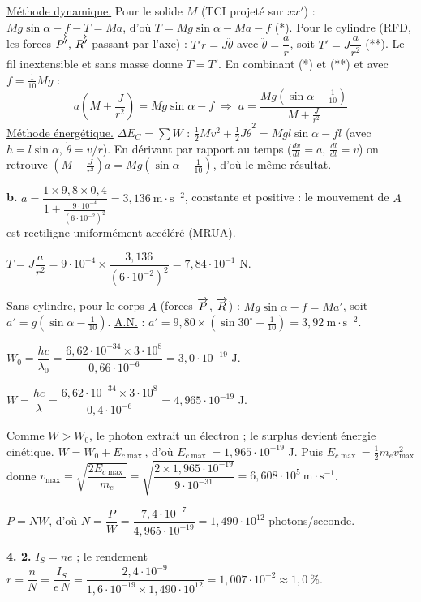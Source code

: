 \documentclass[11pt]{article}
\begin{document}
 \underline{Méthode dynamique.} Pour le solide $M$ (TCI projeté sur $xx'$) : $Mg\sin\alpha - f - T = Ma$, d'où $T = Mg\sin\alpha - Ma - f$ \;(*). Pour le cylindre (RFD, les forces $\overrightarrow{P'}$, $\overrightarrow{R'}$ passant par l'axe) : $T'r = J\ddot{\theta}$ avec $\ddot{\theta} = \dfrac{a}{r}$, soit $T' = J\dfrac{a}{r^2}$ \;(**). Le fil inextensible et sans masse donne $T = T'$. En combinant (*) et (**) et avec $f = \frac{1}{10}Mg$ :
\[ a\left(M + \frac{J}{r^2}\right) = Mg\sin\alpha - f \;\Rightarrow\; \boxed{a = \dfrac{Mg\left(\sin\alpha - \frac{1}{10}\right)}{M + \frac{J}{r^2}}} \]
\underline{Méthode énergétique.} $\Delta E_C = \sum W$ : $\frac{1}{2}Mv^2 + \frac{1}{2}J\dot{\theta}^2 = Mgl\sin\alpha - f l$ (avec $h = l\sin\alpha$, $\dot{\theta} = v/r$). En dérivant par rapport au temps ($\frac{dv}{dt} = a$, $\frac{dl}{dt} = v$) on retrouve $\left(M + \frac{J}{r^2}\right)a = Mg\left(\sin\alpha - \frac{1}{10}\right)$, d'où le même résultat.

\textbf{b.} $a = \dfrac{1\times 9{,}8\times 0{,}4}{1 + \frac{9\cdot10^{-4}}{(6\cdot10^{-2})^2}} = 3{,}136\ \text{m}\cdot\text{s}^{-2}$, constante et positive : le mouvement de $A$ est rectiligne uniformément accéléré (MRUA).

 $T = J\dfrac{a}{r^2} = 9\cdot10^{-4}\times\dfrac{3{,}136}{(6\cdot10^{-2})^2} = 7{,}84\cdot10^{-1}$ N.

 Sans cylindre, pour le corps $A$ (forces $\overrightarrow{P}$, $\overrightarrow{R}$) : $Mg\sin\alpha - f = Ma'$, soit $a' = g\left(\sin\alpha - \frac{1}{10}\right)$. \underline{A.N.} : $a' = 9{,}80\times\left(\sin 30^\circ - \frac{1}{10}\right) = 3{,}92\ \text{m}\cdot\text{s}^{-2}$.


 $W_0 = \dfrac{hc}{\lambda_0} = \dfrac{6{,}62\cdot10^{-34}\times 3\cdot10^{8}}{0{,}66\cdot10^{-6}} = 3{,}0\cdot10^{-19}$ J.

 $W = \dfrac{hc}{\lambda} = \dfrac{6{,}62\cdot10^{-34}\times 3\cdot10^{8}}{0{,}4\cdot10^{-6}} = 4{,}965\cdot10^{-19}$ J.

 Comme $W > W_0$, le photon extrait un électron ; le surplus devient énergie cinétique. $W = W_0 + E_{c\max}$, d'où $E_{c\max} = 1{,}965\cdot10^{-19}$ J. Puis $E_{c\max} = \frac{1}{2}m_e v_{\max}^2$ donne $v_{\max} = \sqrt{\dfrac{2E_{c\max}}{m_e}} = \sqrt{\dfrac{2\times 1{,}965\cdot10^{-19}}{9\cdot10^{-31}}} = 6{,}608\cdot10^{5}\ \text{m}\cdot\text{s}^{-1}$.

 $P = NW$, d'où $N = \dfrac{P}{W} = \dfrac{7{,}4\cdot10^{-7}}{4{,}965\cdot10^{-19}} = 1{,}490\cdot10^{12}$ photons/seconde.

\textbf{4. 2.} $I_S = ne$ ; le rendement $r = \dfrac{n}{N} = \dfrac{I_S}{e\,N} = \dfrac{2{,}4\cdot10^{-9}}{1{,}6\cdot10^{-19}\times 1{,}490\cdot10^{12}} = 1{,}007\cdot10^{-2} \approx 1{,}0\ \%$.
\end{document}
